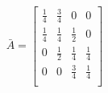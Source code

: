 \documentclass{article}
\begin{document}
\begin{equation}
\bar{A} = 
\left[  \begin{array}{cccc}
        \frac{1}{4} & \frac{3}{4} & 0           & 0            \\ 
        \frac{1}{4} & \frac{1}{4} & \frac{1}{2} & 0            \\
        0           & \frac{1}{2} & \frac{1}{4} & \frac{1}{4}  \\
        0           & 0           & \frac{3}{4} & \frac{1}{4}  \\ 
		\end{array} \right]
\end{equation}








\begin{abstract}
 
\end{abstract}



 

\end{document}
